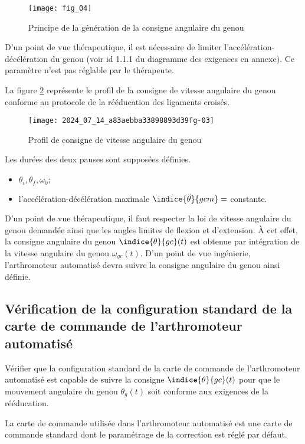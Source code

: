 \begin{figure}[!h]
\centering
\texttt{[image: fig\_04]}
\caption{\label{fig:ccs_mp_2024:fig:04}Principe de la génération de la consigne angulaire du genou}
\end{figure}



D'un point de vue thérapeutique, il est nécessaire de limiter l'accélération-décélération du genou (voir id 1.1.1 du diagramme des exigences en annexe). Ce paramètre n'est pas réglable par le thérapeute.

La figure \ref{fig:ccs_mp_2024:fig:05} représente le profil de la consigne de vitesse angulaire du genou conforme au protocole de la rééducation des ligaments croisés.

\begin{figure}[!h]
\centering
\texttt{[image: 2024\_07\_14\_a83aebba33898893d39fg-03]}
\caption{\label{fig:ccs_mp_2024:fig:05}Profil de consigne de vitesse angulaire du genou}
\end{figure}
Les durées des deux pauses sont supposées définies.

\begin{itemize}
\item $\theta_{i}, \theta_{f}, \omega_{0} ;$
  \item l'accélération-décélération maximale $\indice{\ddot{\theta}}{g c m}=$ constante.
\end{itemize}
D'un point de vue thérapeutique, il faut respecter la loi de vitesse angulaire du genou demandée ainsi que les angles limites de flexion et d'extension. À cet effet, la consigne angulaire du genou $\indice{\theta}{g c}(t)$ est obtenue par intégration de la vitesse angulaire du genou $\omega_{g c}(t)$. D'un point de vue ingénierie, l'arthromoteur automatisé devra suivre la consigne angulaire du genou ainsi définie.

\subsection{Vérification de la configuration standard de la carte de commande de l'arthromoteur automatisé}
\begin{obj}
Vérifier que la configuration standard de la carte de commande de l'arthromoteur automatisé est capable de suivre la consigne $\indice{\theta}{g c}(t)$ pour que le mouvement angulaire du genou $\theta_{g}(t)$ soit conforme aux exigences de la rééducation.
\end{obj}
La carte de commande utilisée dans l'arthromoteur automatisé est une carte de commande standard dont le paramétrage de la correction est réglé par défaut.

